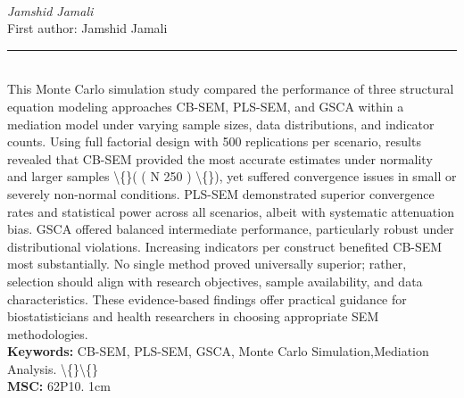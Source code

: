 \documentclass[10pt,twoside]{article}
\begin{document}
\noindent\begin{minipage}[t][\textheight]{\textwidth}
\\[0.35em]
{\itshape Jamshid Jamali}\\[0.2em]
{\footnotesize First author: Jamshid Jamali}\\[0.45em]
\noindent\rule{\textwidth}{0.3pt}\\[0.4em]
{\footnotesize  This Monte Carlo simulation study compared the performance of three structural equation modeling approaches CB-SEM, PLS-SEM, and GSCA within a mediation model under varying sample sizes, data distributions, and indicator counts. Using full factorial design with 500 replications per scenario, results revealed that CB-SEM provided the most accurate estimates under normality and larger samples \textbackslash\{\}( ( N 250 ) \textbackslash\{\}), yet suffered convergence issues in small or severely non-normal conditions. PLS-SEM demonstrated superior convergence rates and statistical power across all scenarios, albeit with systematic attenuation bias. GSCA offered balanced intermediate performance, particularly robust under distributional violations. Increasing indicators per construct benefited CB-SEM most substantially. No single method proved universally superior; rather, selection should align with research objectives, sample availability, and data characteristics. These evidence-based findings offer practical guidance for biostatisticians and health researchers in choosing appropriate SEM methodologies.}\\[0.4em]
{\footnotesize\bfseries Keywords:} {\footnotesize CB-SEM, PLS-SEM, GSCA, Monte Carlo Simulation,Mediation Analysis. \textbackslash\{\}\textbackslash\{\}}\\[0.15em]
{\footnotesize\bfseries MSC:} {\footnotesize 62P10. 1cm}\\
\vfill
\end{minipage}
\newpage
\end{document}
